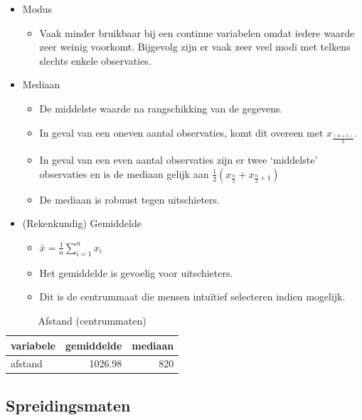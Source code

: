 \documentclass[]{tufte-book}
\providecommand{\tightlist}{%
  \setlength{\itemsep}{0pt}\setlength{\parskip}{0pt}}
\begin{document}
\begin{itemize}
\tightlist
\item
  Modus

  \begin{itemize}
  \tightlist
  \item
    Vaak minder bruikbaar bij een continue variabelen omdat iedere waarde zeer weinig voorkomt. Bijgevolg zijn er vaak zeer veel modi met telkens slechts enkele observaties.
  \end{itemize}
\item
  Mediaan

  \begin{itemize}
  \tightlist
  \item
    De middelste waarde na rangschikking van de gegevens.
  \item
    In geval van een oneven aantal observaties, komt dit overeen met \(x_{\frac{(n+1)}{2}}\).
  \item
    In geval van een even aantal observaties zijn er twee `middelste' observaties en is de mediaan gelijk aan \(\frac{1}{2}( x_{\frac{n}{2}}+x_{\frac{n}{2}+1})\)
  \item
    De mediaan is robuust tegen uitschieters.
  \end{itemize}
\item
  (Rekenkundig) Gemiddelde

  \begin{itemize}
  \tightlist
  \item
    \(\bar{x} = \frac{1}{n}\sum_{i=1}^n x_i\)
  \item
    Het gemiddelde is gevoelig voor uitschieters.
  \item
    Dit is de centrummaat die mensen intuïtief selecteren indien mogelijk.
  \end{itemize}
\end{itemize}

\begin{table}

\caption{\label{tab:4-9}Afstand (centrummaten)}
\centering
\fontsize{10}{12}\selectfont
\begin{tabular}[t]{lrr}
\toprule
variabele & gemiddelde & mediaan\\
\midrule
afstand & 1026.98 & 820\\
\bottomrule
\end{tabular}
\end{table}

\hypertarget{spreidingsmaten-1}{%
\subsection*{Spreidingsmaten}\label{spreidingsmaten-1}}
\end{document}
